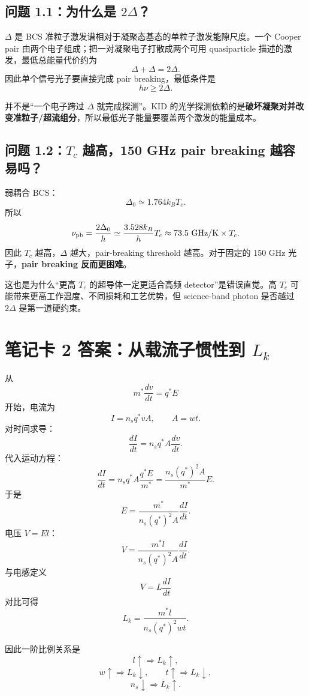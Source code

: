 \documentclass[11pt,a4paper,openany]{ctexrep}
\begin{document}
\subsection*{问题 1.1：为什么是 $2\Delta$？}

$\Delta$ 是 BCS 准粒子激发谱相对于凝聚态基态的单粒子激发能隙尺度。一个 Cooper pair 由两个电子组成；把一对凝聚电子打散成两个可用 quasiparticle 描述的激发，最低总能量代价约为
\[
\Delta+\Delta=2\Delta.
\]
因此单个信号光子要直接完成 pair breaking，最低条件是
\[
h\nu\ge 2\Delta.
\]

\begin{answerbox}[title=物理图景]
并不是“一个电子跨过 $\Delta$ 就完成探测”。KID 的光学探测依赖的是\textbf{破坏凝聚对并改变准粒子/超流组分}，所以最低光子能量要覆盖两个激发的能量成本。
\end{answerbox}

\subsection*{问题 1.2：$T_c$ 越高，150 GHz pair breaking 越容易吗？}

弱耦合 BCS：
\[
\Delta_0\simeq1.764k_B T_c.
\]
所以
\[
\nu_{\rm pb}=\frac{2\Delta_0}{h}
\simeq\frac{3.528k_B}{h}T_c
\approx73.5\ \mathrm{GHz/K}\times T_c.
\]
因此 $T_c$ 越高，$\Delta$ 越大，pair-breaking threshold 越高。对于固定的 150 GHz 光子，\textbf{pair breaking 反而更困难}。

这也是为什么“更高 $T_c$ 的超导体一定更适合高频 detector”是错误直觉。高 $T_c$ 可能带来更高工作温度、不同损耗和工艺优势，但 science-band photon 是否越过 $2\Delta$ 是第一道硬约束。

\section{笔记卡 2 答案：从载流子惯性到 $L_k$}

从
\[
m^*\frac{dv}{dt}=q^*E
\]
开始，电流为
\[
I=n_s q^* v A,
\qquad A=wt.
\]
对时间求导：
\[
\frac{dI}{dt}=n_s q^* A\frac{dv}{dt}.
\]
代入运动方程：
\[
\frac{dI}{dt}
=n_s q^*A\frac{q^*E}{m^*}
=\frac{n_s(q^*)^2A}{m^*}E.
\]
于是
\[
E=\frac{m^*}{n_s(q^*)^2A}\frac{dI}{dt}.
\]
电压 $V=El$：
\[
V=\frac{m^*l}{n_s(q^*)^2A}\frac{dI}{dt}.
\]
与电感定义
\[
V=L\frac{dI}{dt}
\]
对比可得
\[
\boxed{
L_k=\frac{m^*l}{n_s(q^*)^2wt}
}.
\]

因此一阶比例关系是
\[
l\uparrow\Rightarrow L_k\uparrow,
\]
\[
w\uparrow\Rightarrow L_k\downarrow,
\qquad
t\uparrow\Rightarrow L_k\downarrow,
\]
\[
n_s\downarrow\Rightarrow L_k\uparrow.
\]
\end{document}
